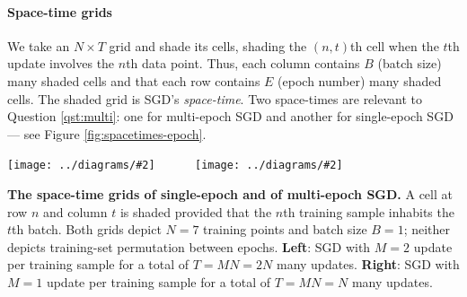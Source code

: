 \documentclass[openany, notitlepage, justified]{tufte-book}
\theoremstyle{plain}
\theoremstyle{definition}
\newcommand{\dmoo}[2]{\texttt{[image: ../diagrams/\#2]}}
\begin{document}
        \paragraph{Space-time grids}
            We take an $N\times T$ grid and shade its cells, shading the
            $(n,t)$th cell when the $t$th update involves the $n$th data point.
            Thus, each column contains $B$ (batch size) many shaded cells and
            that each row contains $E$ (epoch number) many shaded cells.
            The shaded grid is SGD's \emph{space-time}.
            Two space-times are relevant to Question \ref{qst:multi}: one for
            multi-epoch SGD and another for single-epoch SGD --- see Figure
            \ref{fig:spacetimes-epoch}.
            \begin{marginfigure} 
                \centering
                \dmoo{3.55cm}{spacetime-b1-e2-nosh}
                ~~~~~
                \dmoo{3.55cm}{spacetime-b1-e1-nosh}
                \caption{
                    \textbf{The space-time grids of single-epoch and of
                    multi-epoch SGD.}  A cell at row $n$ and column $t$ is
                    shaded provided that the $n$th training sample inhabits the
                    $t$th batch.  Both grids depict $N=7$
                    training points and batch size $B=1$; neither
                    depicts training-set permutation between epochs.
                    \newline
                    \textbf{Left}:
                        SGD with $M=2$ update per training sample for a total
                        of $T = MN = 2N$ many updates.
                    \newline
                    \textbf{Right}:
                        SGD with $M=1$ update per training sample for a total
                        of $T = MN = N$ many updates.
                }
                \label{fig:spacetimes-epoch}
            \end{marginfigure}

        \newpage
\end{document}
